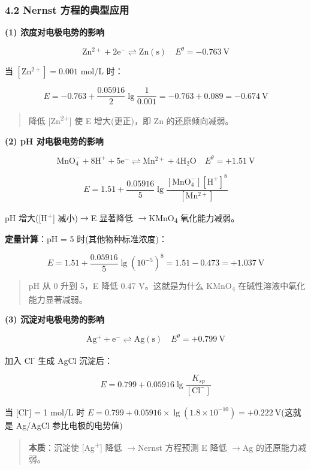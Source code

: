 \documentclass[a4paper,11pt]{ctexart}
\newcommand{\箭}{\ensuremath{\rightarrow}}
\newcommand{\左箭}{\ensuremath{\leftarrow}}
\newcommand{\上箭}{\ensuremath{\uparrow}}
\newcommand{\下箭}{\ensuremath{\downarrow}}
\newcommand{\衡}{\ensuremath{\rightleftharpoons}}
\newcommand{\双箭}{\ensuremath{\leftrightarrow}}
\newcommand{\约等于}{\ensuremath{\approx}}
\newcommand{\小于等于}{\ensuremath{\leq}}
\newcommand{\大于等于}{\ensuremath{\geq}}
\newcommand{\不等于}{\ensuremath{\neq}}
\newcommand{\西格马}{\ensuremath{\sigma}}
\newcommand{\派}{\ensuremath{\pi}}
\begin{document}
\subsubsection{4.2 Nernst 方程的典型应用}\label{nernst-ux65b9ux7a0bux7684ux5178ux578bux5e94ux7528}

\textbf{(1) 浓度对电极电势的影响}

\[
\mathrm{Zn^{2+} + 2e^- \rightleftharpoons Zn(s)} \quad E^\theta = -0.763\ \mathrm{V}
\]

当 \([\mathrm{Zn^{2+}}] = 0.001\) mol/L 时：

\[
E = -0.763 + \frac{0.05916}{2}\lg\frac{1}{0.001} = -0.763 + 0.089 = -0.674\ \mathrm{V}
\]

\begin{quote}
降低 {[}Zn\textsuperscript{2+}{]} 使 E 增大(更正)，即 Zn 的还原倾向减弱。
\end{quote}

\textbf{(2) pH 对电极电势的影响}

\[
\mathrm{MnO_4^- + 8H^+ + 5e^- \rightleftharpoons Mn^{2+} + 4H_2O} \quad E^\theta = +1.51\ \mathrm{V}
\]

\[
E = 1.51 + \frac{0.05916}{5}\lg\frac{[\mathrm{MnO_4^-}][\mathrm{H^+}]^8}{[\mathrm{Mn^{2+}}]}
\]

pH 增大({[}H\textsuperscript{+}{]} 减小)\箭 E 显著降低 \箭 KMnO\textsubscript{4} 氧化能力减弱。

\textbf{定量计算}：pH = 5 时(其他物种标准浓度)：

\[E = 1.51 + \frac{0.05916}{5}\lg(10^{-5})^8 = 1.51 - 0.473 = +1.037\ \mathrm{V}\]

\begin{quote}
pH 从 0 升到 5，E 降低 0.47 V。这就是为什么 KMnO\textsubscript{4} 在碱性溶液中氧化能力显著减弱。
\end{quote}

\textbf{(3) 沉淀对电极电势的影响}

\[
\mathrm{Ag^+ + e^- \rightleftharpoons Ag(s)} \quad E^\theta = +0.799\ \mathrm{V}
\]

加入 Cl\textsuperscript{-} 生成 AgCl 沉淀后：

\[
E = 0.799 + 0.05916\lg\frac{K_{sp}}{[\mathrm{Cl^-}]}
\]

当 {[}Cl\textsuperscript{-}{]} = 1 mol/L 时 \(E = 0.799 + 0.05916 \times \lg(1.8 \times 10^{-10}) = +0.222\ \mathrm{V}\)(这就是 Ag/AgCl 参比电极的电势值)

\begin{quote}
\textbf{本质}：沉淀使 {[}Ag\textsuperscript{+}{]} 降低 \箭 Nernst 方程预测 E 降低 \箭 Ag 的还原能力减弱。
\end{quote}
\end{document}
